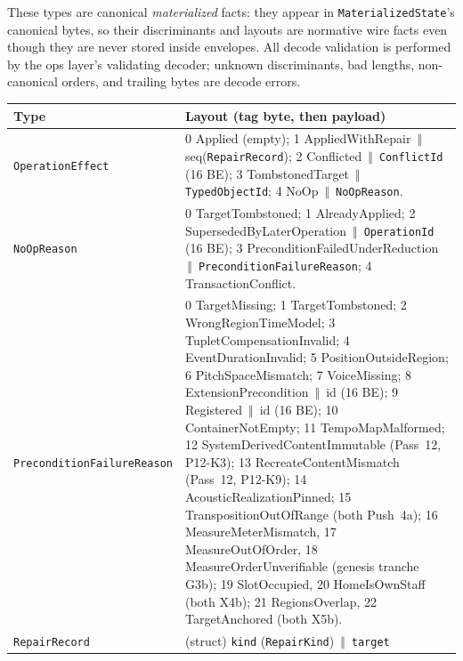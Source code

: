 \documentclass[11pt,letterpaper]{report}
\newcommand{\tablenums}[1]{{\addfontfeatures{Numbers={Lining,Tabular}}#1}}
\newcommand{\cat}{\ensuremath{\,\Vert\,}}
\begin{document}
These types are canonical \emph{materialized} facts: they appear in
\texttt{MaterializedState}'s canonical bytes, so their discriminants and
layouts are normative wire facts even though they are never stored inside
envelopes. All decode validation is performed by the ops layer's validating
decoder; unknown discriminants, bad lengths, non-canonical orders, and
trailing bytes are decode errors.

\begingroup\footnotesize
\begin{longtable}{>{\raggedright\arraybackslash}p{1.6in} p{4.1in}}
  \toprule
  \textbf{Type} & \textbf{Layout (tag byte, then payload)} \\
  \midrule
  \endhead
  \texttt{OperationEffect} &
    \tablenums{0} Applied (empty);
    \tablenums{1} AppliedWithRepair \cat{} seq(\texttt{RepairRecord});
    \tablenums{2} Conflicted \cat{} \texttt{ConflictId} (16 BE);
    \tablenums{3} TombstonedTarget \cat{} \texttt{TypedObjectId};
    \tablenums{4} NoOp \cat{} \texttt{NoOpReason}. \\
  \texttt{NoOpReason} &
    \tablenums{0} TargetTombstoned; \tablenums{1} AlreadyApplied;
    \tablenums{2} SupersededByLaterOperation \cat{} \texttt{OperationId}
    (16 BE); \tablenums{3} PreconditionFailedUnderReduction \cat{}
    \texttt{PreconditionFailureReason}; \tablenums{4} TransactionConflict. \\
  \texttt{Precondition\allowbreak FailureReason} &
    \tablenums{0} TargetMissing; \tablenums{1} TargetTombstoned;
    \tablenums{2} WrongRegionTimeModel;
    \tablenums{3} TupletCompensationInvalid;
    \tablenums{4} EventDurationInvalid; \tablenums{5} PositionOutsideRegion;
    \tablenums{6} PitchSpaceMismatch; \tablenums{7} VoiceMissing;
    \tablenums{8} ExtensionPrecondition \cat{} id (16 BE);
    \tablenums{9} Registered \cat{} id (16 BE);
    \tablenums{10} ContainerNotEmpty;
    \tablenums{11} TempoMapMalformed;
    \tablenums{12} SystemDerivedContentImmutable (Pass~12, P12-K3);
    \tablenums{13} RecreateContentMismatch (Pass~12, P12-K9);
    \tablenums{14} AcousticRealizationPinned;
    \tablenums{15} TranspositionOutOfRange (both Push~4a);
    \tablenums{16} MeasureMeterMismatch, \tablenums{17} MeasureOutOfOrder,
    \tablenums{18} MeasureOrderUnverifiable (genesis tranche G3b);
    \tablenums{19} SlotOccupied, \tablenums{20} HomeIsOwnStaff (both X4b);
    \tablenums{21} RegionsOverlap, \tablenums{22} TargetAnchored (both X5b). \\
  \texttt{RepairRecord} &
    (struct) \texttt{kind} (\texttt{RepairKind}) \cat{} \texttt{target}

\end{longtable}
\end{document}

